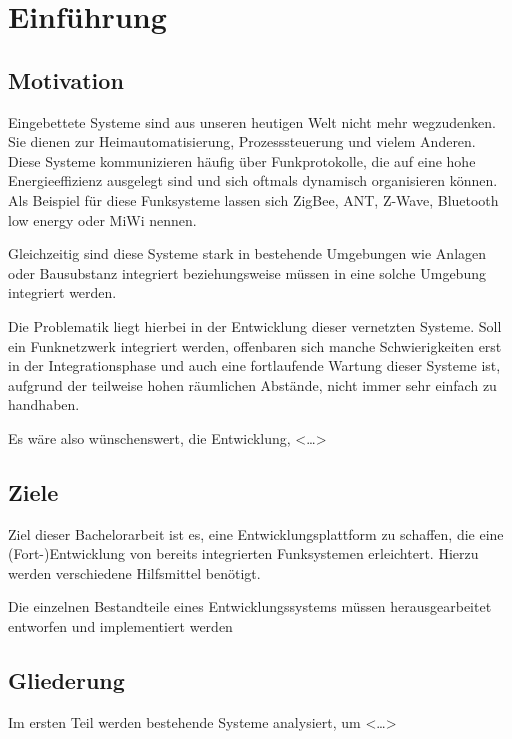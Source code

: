 \chapter{Einführung}
\adjustmtc
\minitoc
\section{Motivation}
Eingebettete Systeme sind aus unseren heutigen Welt nicht mehr wegzudenken. Sie
dienen zur Heimautomatisierung, Prozesssteuerung und vielem
Anderen. Diese Systeme kommunizieren
häufig über Funkprotokolle, die auf eine hohe Energieeffizienz ausgelegt sind
und sich oftmals dynamisch organisieren können. Als Beispiel für diese
Funksysteme lassen sich ZigBee, ANT, Z-Wave, Bluetooth low energy oder MiWi
nennen.

Gleichzeitig sind diese Systeme stark in bestehende Umgebungen wie Anlagen oder
Bausubstanz integriert beziehungsweise müssen in eine solche Umgebung
integriert werden.

Die Problematik liegt hierbei in der Entwicklung dieser vernetzten Systeme. Soll
ein Funknetzwerk integriert werden, offenbaren sich manche Schwierigkeiten erst
in der Integrationsphase und auch eine fortlaufende Wartung dieser Systeme ist,
aufgrund der teilweise hohen räumlichen Abstände, nicht immer sehr einfach zu
handhaben.

Es wäre also wünschenswert, die Entwicklung,  <\ldots>

\section{Ziele}
Ziel dieser Bachelorarbeit ist es, eine Entwicklungsplattform zu schaffen, die
eine (Fort-)Entwicklung von bereits integrierten Funksystemen erleichtert.
Hierzu werden verschiedene Hilfsmittel benötigt.

Die einzelnen Bestandteile eines Entwicklungssystems müssen herausgearbeitet
entworfen und implementiert werden

\section{Gliederung}
Im ersten Teil werden bestehende Systeme analysiert, um <\ldots>
